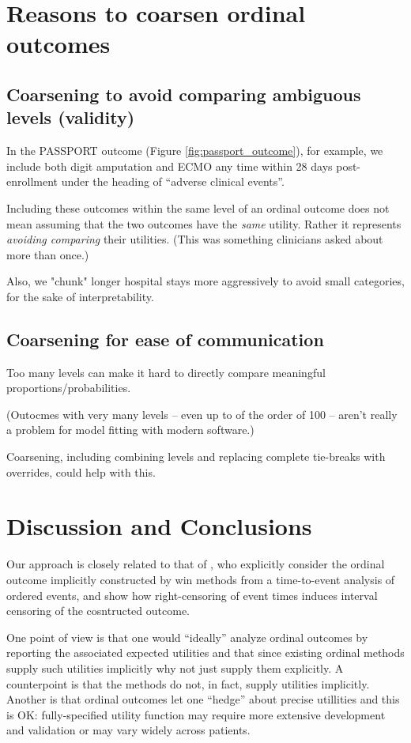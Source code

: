 \documentclass[
  11pt,
  fleqn
]{article}
\begin{document}
\section{Reasons to coarsen ordinal outcomes}

\subsection{Coarsening to avoid comparing ambiguous levels (validity)}

In the PASSPORT outcome (Figure \ref{fig:passport_outcome}), for
example, we include both digit
amputation and ECMO
any time within 28 days post-enrollment under the heading of
``adverse clinical events''.

Including these outcomes within the same level of an
ordinal outcome does not mean assuming that the two outcomes have the
\emph{same} utility. Rather it represents \emph{avoiding comparing}
their utilities. (This was something clinicians asked about more than once.)

Also, we "chunk" longer hospital stays more aggressively to avoid
small categories, for the sake of interpretability.

\subsection{Coarsening for ease of communication}

Too many levels can make it hard to directly compare meaningful
proportions/probabilities.

(Outocmes with very many levels -- even up to of the order of 100 --
aren't really a problem for model fitting with modern software.)

Coarsening, including combining levels and replacing complete
tie-breaks with overrides, could help with this.

\section{Discussion and Conclusions}

Our approach is closely related to that of
\citet{follmannAnalysisOrderedComposite2020},
who explicitly consider the ordinal outcome implicitly constructed by
win methods from a time-to-event analysis of ordered events, and show
how right-censoring of event times induces interval censoring of the
cosntructed outcome.

One point of view is that one would ``ideally'' analyze ordinal outcomes by
reporting the associated expected utilities  and that since existing ordinal
methods supply
such utilities implicitly why not just supply them explicitly. A
counterpoint
is that the methods do not, in fact, supply utilities implicitly.
Another is that ordinal outcomes let one ``hedge'' about precise
utillities and this is OK:
fully-specified utility function may require more
extensive development and validation or may vary widely across patients.

\newpage

\printbibliography
\end{document}
